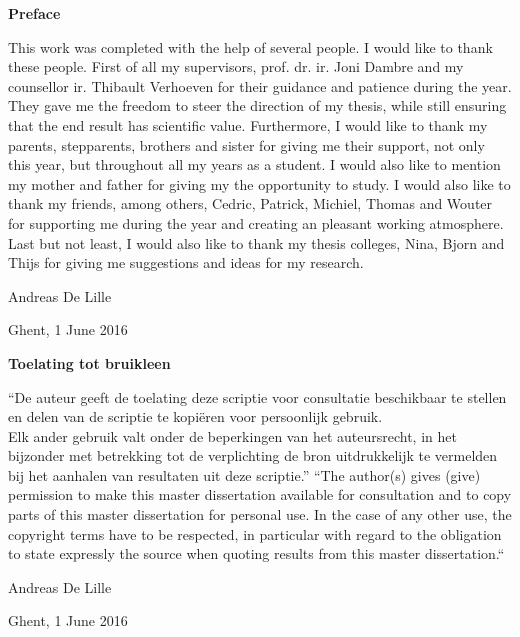 
\newpage

\noindent \textbf{\huge Preface}

\vspace{1.5cm}

\noindent

This work was completed with the help of several people. I would like to thank these people. First of all my supervisors, prof. dr. ir. Joni Dambre and my counsellor ir. Thibault Verhoeven for their guidance and patience during the year. They gave me the freedom to steer the direction of my thesis, while still ensuring that the end result has scientific value.
\npar
Furthermore, I would like to thank my parents, stepparents, brothers and sister for giving me their support, not only this year, but throughout all my years as a student. I would also like to mention my mother and father for giving my the opportunity to study.
\npar
I would also like to thank my friends, among others, Cedric, Patrick, Michiel, Thomas and Wouter for supporting me during the year and creating an pleasant working atmosphere. 
\npar
Last but not least, I would also like to thank my thesis colleges, Nina, Bjorn and Thijs for giving me suggestions and ideas for my research.

\addvspace{3cm}

\hfill \noindent Andreas De Lille

\hfill \noindent Ghent, 1 June 2016


\addvspace{9cm}

\doclicenseThis

\clearpage

\noindent \textbf{\huge Toelating tot bruikleen}

\vspace{1.5cm}

\noindent
``De auteur geeft de toelating deze scriptie voor consultatie beschikbaar
te stellen en delen van de scriptie te kopi\"eren voor persoonlijk
gebruik.\\
Elk ander gebruik valt onder de beperkingen van het auteursrecht,
in het bijzonder met betrekking tot de verplichting de bron uitdrukkelijk
te vermelden bij het aanhalen van resultaten uit deze scriptie.''
\npar
``The author(s) gives (give) permission to make this master dissertation available for consultation
and to copy parts of this master dissertation for personal use.
 In the case of any other use, the copyright terms have to be respected, in particular with regard to
the obligation to state expressly the source when quoting results from this master dissertation.``

\addvspace{4cm}

\hfill \noindent Andreas De Lille

\hfill \noindent Ghent, 1 June 2016